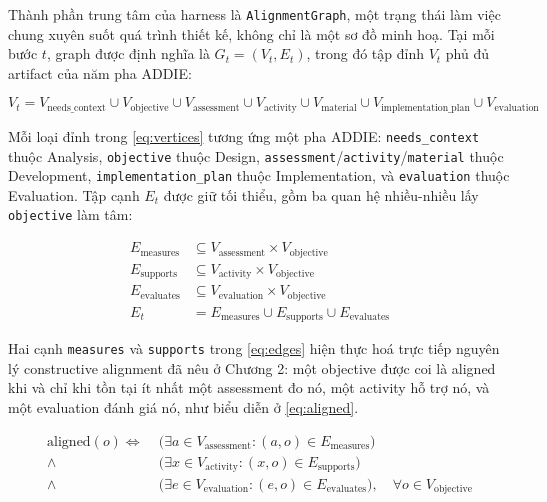 \documentclass[../main.tex]{subfiles}
\begin{document}
Thành phần trung tâm của harness là \texttt{AlignmentGraph}, một trạng thái làm việc chung xuyên suốt quá trình thiết kế, không chỉ là một sơ đồ minh hoạ. Tại mỗi bước $t$, graph được định nghĩa là $G_t = (V_t, E_t)$, trong đó tập đỉnh $V_t$ phủ đủ artifact của năm pha ADDIE:

\begin{equation}\label{eq:vertices}
V_t = V_{\text{needs\_context}} \cup V_{\text{objective}} \cup V_{\text{assessment}} \cup V_{\text{activity}} \cup V_{\text{material}} \cup V_{\text{implementation\_plan}} \cup V_{\text{evaluation}}
\end{equation}

Mỗi loại đỉnh trong \eqref{eq:vertices} tương ứng một pha ADDIE: \texttt{needs\_context} thuộc Analysis, \texttt{objective} thuộc Design, \texttt{assessment}/\texttt{activity}/\texttt{material} thuộc Development, \texttt{implementation\_plan} thuộc Implementation, và \texttt{evaluation} thuộc Evaluation. Tập cạnh $E_t$ được giữ tối thiểu, gồm ba quan hệ nhiều-nhiều lấy \texttt{objective} làm tâm:

\begin{equation}\label{eq:edges}
\begin{aligned}
E_{\text{measures}} &\subseteq V_{\text{assessment}} \times V_{\text{objective}} \\
E_{\text{supports}} &\subseteq V_{\text{activity}} \times V_{\text{objective}} \\
E_{\text{evaluates}} &\subseteq V_{\text{evaluation}} \times V_{\text{objective}} \\
E_t &= E_{\text{measures}} \cup E_{\text{supports}} \cup E_{\text{evaluates}}
\end{aligned}
\end{equation}

Hai cạnh \texttt{measures} và \texttt{supports} trong \eqref{eq:edges} hiện thực hoá trực tiếp nguyên lý constructive alignment đã nêu ở Chương 2: một objective được coi là aligned khi và chỉ khi tồn tại ít nhất một assessment đo nó, một activity hỗ trợ nó, và một evaluation đánh giá nó, như biểu diễn ở \eqref{eq:aligned}.

\begin{equation}\label{eq:aligned}
\begin{aligned}
\text{aligned}(o) \iff \; &\big(\exists a \in V_{\text{assessment}} : (a,o) \in E_{\text{measures}}\big) \\
\wedge \; &\big(\exists x \in V_{\text{activity}} : (x,o) \in E_{\text{supports}}\big) \\
\wedge \; &\big(\exists e \in V_{\text{evaluation}} : (e,o) \in E_{\text{evaluates}}\big), \quad \forall o \in V_{\text{objective}}
\end{aligned}
\end{equation}
\end{document}

